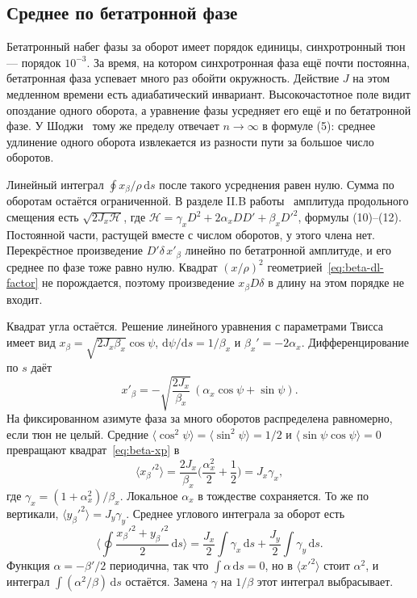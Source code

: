 \subsection{Среднее по бетатронной фазе}
\label{sec:ch2-avg}

Бетатронный набег фазы за оборот имеет порядок единицы, синхротронный тюн --- порядок $10^{-3}$. За время, на котором синхротронная фаза ещё почти постоянна, бетатронная фаза успевает много раз обойти окружность. Действие $J$ на этом медленном времени есть адиабатический инвариант. Высокочастотное поле видит опоздание одного оборота, а уравнение фазы усредняет его ещё и по бетатронной фазе. У Шоджи~\cite{Shoji2005} тому же пределу отвечает $n\to\infty$ в формуле (5): среднее удлинение одного оборота извлекается из разности пути за большое число оборотов.

Линейный интеграл $\oint x_\beta/\rho\,\mathrm{d}s$ после такого усреднения равен нулю. Сумма по оборотам остаётся ограниченной. В разделе II.B работы~\cite{Shoji2005} амплитуда продольного смещения есть $\sqrt{2J_x\mathcal{H}}$, где $\mathcal{H}=\gamma_x D^2+2\alpha_x DD'+\beta_x D'^2$, формулы (10)--(12). Постоянной части, растущей вместе с числом оборотов, у этого члена нет. Перекрёстное произведение $D'\delta\,x'_\beta$ линейно по бетатронной амплитуде, и его среднее по фазе тоже равно нулю. Квадрат $(x/\rho)^2$ геометрией~\eqref{eq:beta-dl-factor} не порождается, поэтому произведение $x_\beta D\delta$ в длину на этом порядке не входит.

Квадрат угла остаётся. Решение линейного уравнения с параметрами Твисса имеет вид $x_\beta=\sqrt{2J_x\beta_x}\cos\psi$, $\mathrm{d}\psi/\mathrm{d}s=1/\beta_x$ и $\beta_x'=-2\alpha_x$. Дифференцирование по $s$ даёт
\begin{equation}
\label{eq:beta-xp}
x'_\beta
=-\sqrt{\frac{2J_x}{\beta_x}}\,(\alpha_x\cos\psi+\sin\psi).
\end{equation}
На фиксированном азимуте фаза за много оборотов распределена равномерно, если тюн не целый. Средние $\langle\cos^2\psi\rangle=\langle\sin^2\psi\rangle=1/2$ и $\langle\sin\psi\cos\psi\rangle=0$ превращают квадрат~\eqref{eq:beta-xp} в
\begin{equation}
\label{eq:beta-xp2}
\langle x_\beta'^2\rangle
=\frac{2J_x}{\beta_x}\Biggl(\frac{\alpha_x^2}{2}+\frac{1}{2}\Biggr)
=J_x\gamma_x,
\end{equation}
где $\gamma_x=(1+\alpha_x^2)/\beta_x$. Локальное $\alpha_x$ в тождестве сохраняется. То же по вертикали, $\langle y_\beta'^2\rangle=J_y\gamma_y$. Среднее углового интеграла за оборот есть
\begin{equation}
\label{eq:beta-angle}
\Biggl\langle\oint\frac{x_\beta'^2+y_\beta'^2}{2}\,\mathrm{d}s\Biggr\rangle
=\frac{J_x}{2}\int\gamma_x\,\mathrm{d}s
+\frac{J_y}{2}\int\gamma_y\,\mathrm{d}s.
\end{equation}
Функция $\alpha=-\beta'/2$ периодична, так что $\int\alpha\,\mathrm{d}s=0$, но в $\langle x'^2\rangle$ стоит $\alpha^2$, и интеграл $\int(\alpha^2/\beta)\,\mathrm{d}s$ остаётся. Замена $\gamma$ на $1/\beta$ этот интеграл выбрасывает.

